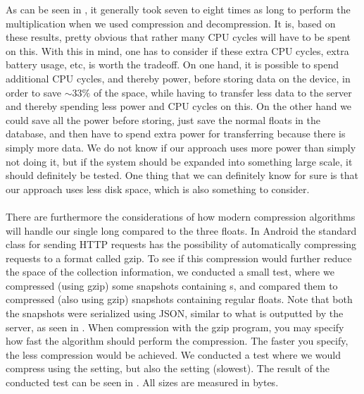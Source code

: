 As can be seen in , it generally took seven to eight times as long to perform the multiplication when we used compression and decompression. It is, based on these results, pretty obvious that rather many CPU cycles will have to be spent on this. With this in mind, one has to consider if these extra CPU cycles, extra battery usage, etc, is worth the tradeoff. On one hand, it is possible to spend additional CPU cycles, and thereby power, before storing data on the device, in order to save $\sim 33\%$ of the space, while having to transfer less data to the server and thereby spending less power and CPU cycles on this. On the other hand we could save all the power before storing, just save the normal floats in the database, and then have to spend extra power for transferring because there is simply more data. We do not know if our approach uses more power than simply not doing it, but if the system should be expanded into something large scale, it should definitely be tested. One thing that we can definitely know for sure is that our approach uses less disk space, which is also something to consider. 
\\\\
There are furthermore the considerations of how modern compression algorithms will handle our single long compared to the three floats. In Android the standard class for sending HTTP requests has the possibility of automatically compressing requests to a format called gzip. To see if this compression would further reduce the space of the collection information, we conducted a small test, where we compressed (using gzip) some snapshots containing s, and compared them to compressed (also using gzip) snapshots containing regular floats. Note that both the snapshots were serialized using JSON, similar to what is outputted by the server, as seen in . When compression with the gzip program, you may specify how fast the algorithm should perform the compression. The faster you specify, the less compression would be achieved. We conducted a test where we would compress using the  setting, but also the  setting (slowest). The result of the conducted test can be seen in . All sizes are measured in bytes.

